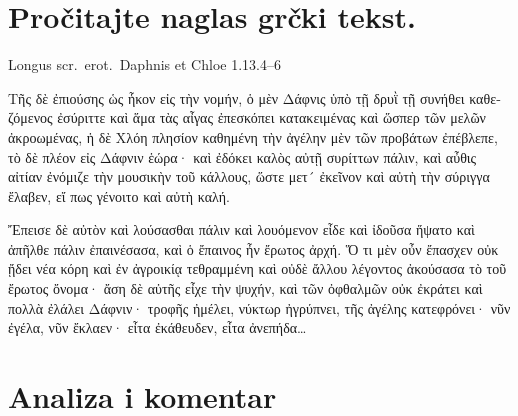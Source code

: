 
\section*{Pročitajte naglas grčki tekst.}

Longus scr.~erot.\ Daphnis et Chloe 1.13.4–6


\medskip


{\large

\begin{greek}

\noindent Τῆς δὲ ἐπιούσης ὡς ἧκον εἰς τὴν νομήν, ὁ μὲν Δάφνις ὑπὸ τῇ δρυῒ τῇ συνήθει καθεζόμενος ἐσύριττε καὶ ἅμα τὰς αἶγας ἐπεσκόπει κατακειμένας καὶ ὥσπερ τῶν μελῶν ἀκροωμένας, ἡ δὲ Χλόη πλησίον καθημένη τὴν ἀγέλην μὲν τῶν προβάτων ἐπέβλεπε, τὸ δὲ πλέον εἰς Δάφνιν ἑώρα· καὶ ἐδόκει καλὸς αὐτῇ συρίττων πάλιν, καὶ αὖθις αἰτίαν ἐνόμιζε τὴν μουσικὴν τοῦ κάλλους, ὥστε μετ´ ἐκεῖνον καὶ αὐτὴ τὴν σύριγγα ἔλαβεν, εἴ πως γένοιτο καὶ αὐτὴ καλή.

Ἔπεισε δὲ αὐτὸν καὶ λούσασθαι πάλιν καὶ λουόμενον εἶδε καὶ ἰδοῦσα ἥψατο καὶ ἀπῆλθε πάλιν ἐπαινέσασα, καὶ ὁ ἔπαινος ἦν ἔρωτος ἀρχή. Ὅ τι μὲν οὖν ἔπασχεν οὐκ ᾔδει νέα κόρη καὶ ἐν ἀγροικίᾳ τεθραμμένη καὶ οὐδὲ ἄλλου λέγοντος ἀκούσασα τὸ τοῦ ἔρωτος ὄνομα· ἄση δὲ αὐτῆς εἶχε τὴν ψυχήν, καὶ τῶν ὀφθαλμῶν οὐκ ἐκράτει καὶ πολλὰ ἐλάλει Δάφνιν· τροφῆς ἠμέλει, νύκτωρ ἠγρύπνει, τῆς ἀγέλης κατεφρόνει· νῦν ἐγέλα, νῦν ἔκλαεν· εἶτα ἐκάθευδεν, εἶτα ἀνεπήδα\dots

\end{greek}

}


\section*{Analiza i komentar}


